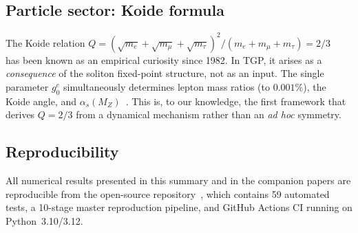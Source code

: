 \subsection{Particle sector: Koide formula}

The Koide relation $Q=(\sqrt{m_e}+\sqrt{m_\mu}+\sqrt{m_\tau})^2
/(m_e+m_\mu+m_\tau)=2/3$~\cite{Koide2007} has been known as
an empirical curiosity since 1982.  In TGP, it arises as a
\emph{consequence} of the soliton fixed-point structure,
not as an input.  The single parameter $g_{0}^{e}$
simultaneously determines lepton mass ratios (to $0.001\%$),
the Koide angle, and $\alpha_{s}(M_{Z})$~\cite{PDG2024}.
This is, to our knowledge, the first framework that derives
$Q=2/3$ from a dynamical mechanism rather than an
\emph{ad hoc} symmetry.

\subsection{Reproducibility}

All numerical results presented in this summary and in the
companion papers are reproducible from the open-source
repository~\cite{TGP-repo}, which contains 59 automated tests,
a 10-stage master reproduction pipeline, and GitHub Actions CI
running on Python~3.10/3.12.

